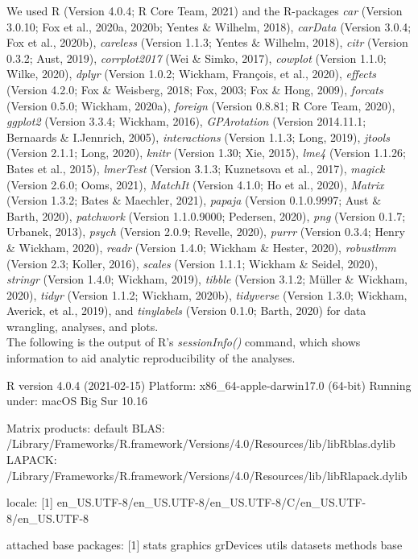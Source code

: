 \begin{appendix}
We used R (Version 4.0.4; R Core Team, 2021) and the R-packages
\emph{car} (Version 3.0.10; Fox et al., 2020a, 2020b; Yentes \& Wilhelm,
2018), \emph{carData} (Version 3.0.4; Fox et al., 2020b),
\emph{careless} (Version 1.1.3; Yentes \& Wilhelm, 2018), \emph{citr}
(Version 0.3.2; Aust, 2019), \emph{corrplot2017} (Wei \& Simko, 2017),
\emph{cowplot} (Version 1.1.0; Wilke, 2020), \emph{dplyr} (Version
1.0.2; Wickham, François, et al., 2020), \emph{effects} (Version 4.2.0;
Fox \& Weisberg, 2018; Fox, 2003; Fox \& Hong, 2009), \emph{forcats}
(Version 0.5.0; Wickham, 2020a), \emph{foreign} (Version 0.8.81; R Core
Team, 2020), \emph{ggplot2} (Version 3.3.4; Wickham, 2016),
\emph{GPArotation} (Version 2014.11.1; Bernaards \& I.Jennrich, 2005),
\emph{interactions} (Version 1.1.3; Long, 2019), \emph{jtools} (Version
2.1.1; Long, 2020), \emph{knitr} (Version 1.30; Xie, 2015), \emph{lme4}
(Version 1.1.26; Bates et al., 2015), \emph{lmerTest} (Version 3.1.3;
Kuznetsova et al., 2017), \emph{magick} (Version 2.6.0; Ooms, 2021),
\emph{MatchIt} (Version 4.1.0; Ho et al., 2020), \emph{Matrix} (Version
1.3.2; Bates \& Maechler, 2021), \emph{papaja} (Version 0.1.0.9997; Aust
\& Barth, 2020), \emph{patchwork} (Version 1.1.0.9000; Pedersen, 2020),
\emph{png} (Version 0.1.7; Urbanek, 2013), \emph{psych} (Version 2.0.9;
Revelle, 2020), \emph{purrr} (Version 0.3.4; Henry \& Wickham, 2020),
\emph{readr} (Version 1.4.0; Wickham \& Hester, 2020), \emph{robustlmm}
(Version 2.3; Koller, 2016), \emph{scales} (Version 1.1.1; Wickham \&
Seidel, 2020), \emph{stringr} (Version 1.4.0; Wickham, 2019),
\emph{tibble} (Version 3.1.2; Müller \& Wickham, 2020), \emph{tidyr}
(Version 1.1.2; Wickham, 2020b), \emph{tidyverse} (Version 1.3.0;
Wickham, Averick, et al., 2019), and \emph{tinylabels} (Version 0.1.0;
Barth, 2020) for data wrangling, analyses, and plots.\\
The following is the output of R's \emph{sessionInfo()} command, which
shows information to aid analytic reproducibility of the analyses.

R version 4.0.4 (2021-02-15) Platform: x86\_64-apple-darwin17.0 (64-bit)
Running under: macOS Big Sur 10.16

Matrix products: default BLAS:
/Library/Frameworks/R.framework/Versions/4.0/Resources/lib/libRblas.dylib
LAPACK:
/Library/Frameworks/R.framework/Versions/4.0/Resources/lib/libRlapack.dylib

locale: {[}1{]}
en\_US.UTF-8/en\_US.UTF-8/en\_US.UTF-8/C/en\_US.UTF-8/en\_US.UTF-8

attached base packages: {[}1{]} stats graphics grDevices utils datasets
methods base


\end{appendix}
